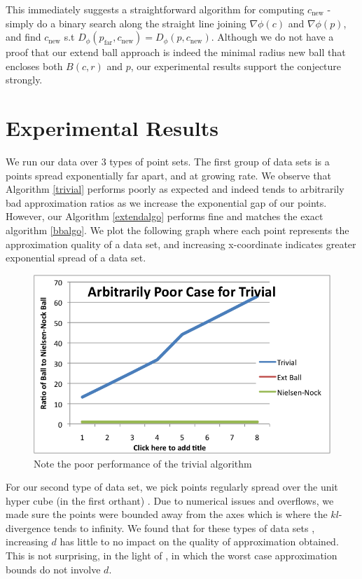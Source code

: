 \documentclass[11pt]{myclass}
\newcommand{\breg}{\ensuremath{D_\phi}}
\begin{document}
This immediately suggests a straightforward algorithm for computing $c_{\text{new}}$ - simply do a binary search along the straight line joining $\nabla \phi(c)$ and $\nabla \phi(p)$, and find $c_{\text{new}}$ s.t $\breg(p_{\text{far}}, c_{\text{new}}) = \breg(p, c_{\text{new}})$. Although we do not have a proof that our extend ball approach is indeed the minimal radius new ball that encloses both $B(c,r)$ and $p$, our experimental results support the conjecture strongly.
 
\section{Experimental Results}
We run our data over $3$ types of point sets. The first group of data sets is a points spread exponentially far apart, and at growing rate. We observe that Algorithm \ref{trivial} performs poorly as expected and indeed tends to arbitrarily bad approximation ratios as we increase the exponential gap of our points. However, our Algorithm \ref{extendalgo} performs fine and matches the exact algorithm \ref{bbalgo}. We plot the following graph where each point represents the approximation quality of a data set, and increasing x-coordinate indicates greater exponential spread of a data set.

\begin{figure}[H]
  \begin{center}
    \includegraphics[scale = 0.8]{../figures/trivial_poor.png}
  \end{center}
  \caption{Note the poor performance of the trivial algorithm}
  \label{Trivial fails}
\end{figure}

For our second type of data set, we pick points regularly spread over the unit hyper cube (in the first orthant) . Due to numerical issues and overflows, we made sure the points were bounded away from the axes which is where the $kl$-divergence tends to infinity. We found that for these types of data sets , increasing $d$ has little to no impact on the quality of approximation obtained. This is not surprising, in the light of \cite{onepointfive}, in which the worst case approximation bounds do not involve $d$.
\end{document}
